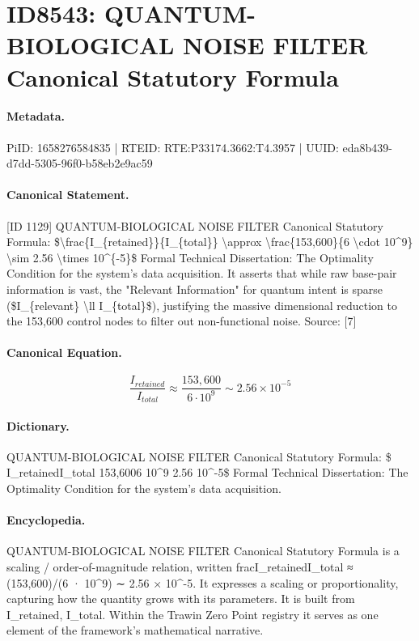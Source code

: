 \section*{ID8543: QUANTUM-BIOLOGICAL NOISE FILTER Canonical Statutory Formula}
\paragraph{Metadata.}
PiID: 1658276584835 | RTEID: RTE:P33174.3662:T4.3957 | UUID: eda8b439-d7dd-5305-96f0-b58eb2e9ac59

\paragraph{Canonical Statement.}
[ID 1129] QUANTUM-BIOLOGICAL NOISE FILTER Canonical Statutory Formula: \$\textbackslash{}frac\{I\_\{retained\}\}\{I\_\{total\}\} \textbackslash{}approx \textbackslash{}frac\{153,600\}\{6 \textbackslash{}cdot 10\textasciicircum{}9\} \textbackslash{}sim 2.56 \textbackslash{}times 10\textasciicircum{}\{-5\}\$ Formal Technical Dissertation: The Optimality Condition for the system's data acquisition. It asserts that while raw base-pair information is vast, the "Relevant Information" for quantum intent is sparse (\$I\_\{relevant\} \textbackslash{}ll I\_\{total\}\$), justifying the massive dimensional reduction to the 153,600 control nodes to filter out non-functional noise. Source: [7]

\paragraph{Canonical Equation.}
\[
\frac{I_{retained}}{I_{total}} \approx \frac{153,600}{6 \cdot 10^9} \sim 2.56 \times 10^{-5}
\]

\paragraph{Dictionary.}
QUANTUM-BIOLOGICAL NOISE FILTER Canonical Statutory Formula: \$ I\_retainedI\_total 153,6006 10\textasciicircum{}9 2.56 10\textasciicircum{}-5\$ Formal Technical Dissertation: The Optimality Condition for the system's data acquisition.

\paragraph{Encyclopedia.}
QUANTUM-BIOLOGICAL NOISE FILTER Canonical Statutory Formula is a scaling / order-of-magnitude relation, written fracI\_retainedI\_total ≈ (153,600)/(6 · 10\textasciicircum{}9) ∼ 2.56 × 10\textasciicircum{}-5. It expresses a scaling or proportionality, capturing how the quantity grows with its parameters. It is built from I\_retained, I\_total. Within the Trawin Zero Point registry it serves as one element of the framework's mathematical narrative.
